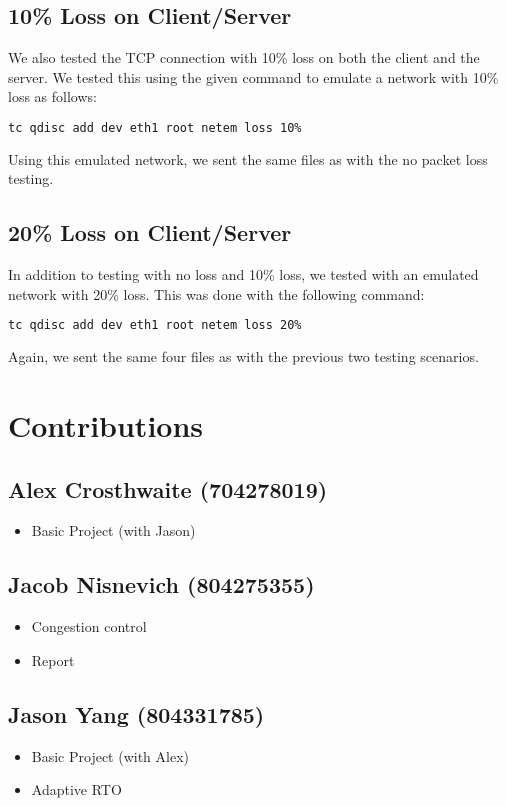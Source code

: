 \documentclass{article}
\begin{document}
\subsection{10\% Loss on Client/Server}

We also tested the TCP connection with 10\% loss on both the client and the server. We tested this using the given command to emulate a network with 10\% loss as follows:

\begin{lstlisting}[language=bash]
tc qdisc add dev eth1 root netem loss 10%
\end{lstlisting}

\noindent
Using this emulated network, we sent the same files as with the no packet loss testing.

\subsection{20\% Loss on Client/Server}

In addition to testing with no loss and 10\% loss, we tested with an emulated network with 20\% loss. This was done with the following command:

\begin{lstlisting}[language=bash]
tc qdisc add dev eth1 root netem loss 20%
\end{lstlisting}

\noindent
Again, we sent the same four files as with the previous two testing scenarios.

\section{Contributions}

\subsection{Alex Crosthwaite (704278019)}

\begin{itemize}
	\item Basic Project (with Jason)
\end{itemize}

\subsection{Jacob Nisnevich (804275355)}

\begin{itemize}
	\item Congestion control
	\item Report
\end{itemize}

\subsection{Jason Yang (804331785)}

\begin{itemize}
	\item Basic Project (with Alex)
	\item Adaptive RTO
\end{itemize}
\end{document}
